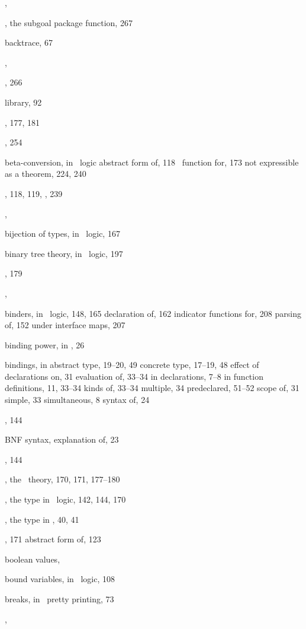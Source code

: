 \begin{theindex}
  \item {}, 
  \item {}, the subgoal package function, 267
  \item backtrace, 67
  \item {}, 
  \item {}, 266
  \item {} library, 92
  \item {}, 177, 181
  \item {}, 254
  \item beta-conversion, in \HOL\ logic
    \subitem abstract form of, 118
    \subitem \ML\ function for, 173
    \subitem not expressible as a theorem, 224, 240
  \item {}, 118, 119, , 239
  \item {}, 
  \item bijection of types, in \HOL\ logic, 167
  \item binary tree theory, in \HOL\ logic, 197
  \item {}, 179
  \item {}, 
  \item binders, in \HOL\ logic, 148, 165
    \subitem declaration of, 162
    \subitem indicator functions for, 208
    \subitem parsing of, 152
    \subitem under interface maps, 207
  \item binding power, in \ML, 26
  \item bindings, in \ML
    \subitem abstract type, 19--20, 49
    \subitem concrete type, 17--19, 48
    \subitem effect of declarations on, 31
    \subitem evaluation of, 33--34
    \subitem in declarations, 7--8
    \subitem in function definitions, 11, 33--34
    \subitem kinds of, 33--34
    \subitem multiple, 34
    \subitem predeclared, 51--52
    \subitem scope of, 31
    \subitem simple, 33
    \subitem simultaneous, 8
    \subitem syntax of, 24
  \item {}, 144
  \item BNF syntax, explanation of, 23
  \item {}, 144
  \item {}, the \HOL\ theory, 170, 171, 177--180
  \item {}, the type in \HOL\ logic, 142, 144, 170
  \item {}, the type in \ML, 40, 41
  \item {}, 171
    \subitem abstract form of, 123
  \item boolean values, 
  \item bound variables, in \HOL\ logic, 108
  \item breaks, in \ML\ pretty printing, 73
  \item {}, 


\end{theindex}
